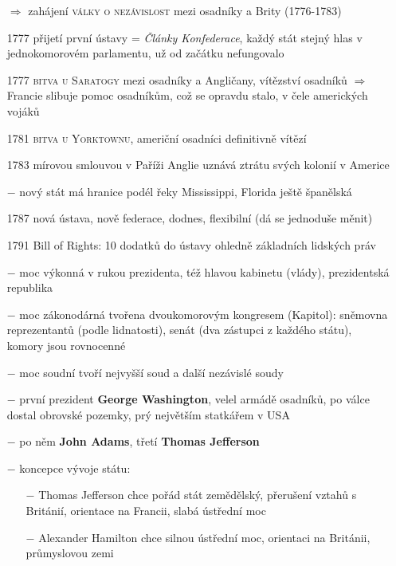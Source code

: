 \documentclass{article}
\begin{document}
\begin{itemize}
    \item[$\Rightarrow$] zahájení \textsc{války o nezávislost} mezi osadníky a Brity (1776-1783)
    \item[1777] přijetí první ústavy = \textit{Články Konfederace}, každý stát stejný hlas v jednokomorovém parlamentu, už od začátku nefungovalo
    \item[1777] \textsc{bitva u Saratogy} mezi osadníky a Angličany, vítězství osadníků $\Rightarrow$  Francie slibuje pomoc osadníkům, což se opravdu stalo, v čele amerických vojáků
    \item[1781] \textsc{bitva u Yorktownu}, američní osadníci definitivně vítězí
    \item[1783] mírovou smlouvou v Paříži Anglie uznává ztrátu svých kolonií v Americe
    \item[$-$] nový stát má hranice podél řeky Mississippi, Florida ještě španělská
    \item[1787] nová ústava, nově federace, dodnes, flexibilní (dá se jednoduše měnit)
    \item[1791] Bill of Rights: 10 dodatků do ústavy ohledně základních lidských práv
    \item[$-$] moc výkonná v rukou prezidenta, též hlavou kabinetu (vlády), prezidentská republika
    \item[$-$] moc zákonodárná tvořena dvoukomorovým kongresem (Kapitol): sněmovna reprezentantů (podle lidnatosti), senát (dva zástupci z každého státu), komory jsou rovnocenné
    \item[$-$] moc soudní tvoří nejvyšší soud a další nezávislé soudy
    \item[$-$] první prezident \textbf{George Washington}, velel armádě osadníků, po válce dostal obrovské pozemky, prý největším statkářem v USA
    \item[$-$] po něm \textbf{John Adams}, třetí \textbf{Thomas Jefferson}
    \item[$-$] koncepce vývoje státu:
    \begin{itemize}
        \vspace{-0.5em}
        \setlength\itemsep{0.15em}
        \item[$-$] Thomas Jefferson chce pořád stát zemědělský, přerušení vztahů s Británií, orientace na Francii, slabá ústřední moc
        \item[$-$] Alexander Hamilton chce silnou ústřední moc, orientaci na Británii, průmyslovou zemi
    \end{itemize}

\end{itemize}
\end{document}
